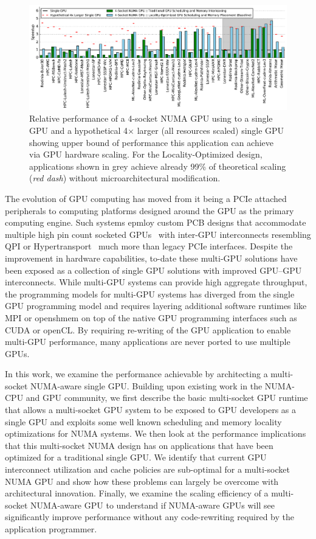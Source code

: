 \begin{figure}[tp] 
    \centering
    \includegraphics[width=1.0\linewidth]{figures/plot_different_baselines.pdf}
    \caption{Relative performance of a 4-socket NUMA GPU using to a single GPU 
and a hypothetical 4$\times$ larger (all resources scaled) single GPU showing 
upper bound of performance this application can achieve via GPU hardware 
scaling. For the Locality-Optimized design, applications shown in grey 
achieve already 99\% of theoretical scaling (\emph{red dash}) without 
microarchitectural modification.}
    \label{fig:motivation}
\end{figure}

The evolution of GPU computing has moved from it being a PCIe attached peripherals 
to computing platforms designed around the GPU as the primary computing engine. 
Such systems epmloy custom PCB designs that accommodate multiple high pin count socketed 
GPUs~\cite{DGX} with inter-GPU interconnects resembling QPI or 
Hypertransport~\cite{INTELQPI,AMDHT} much more than legacy PCIe interfaces.  
Despite the improvement in hardware capabilities, to-date these multi-GPU 
solutions have been exposed as a collection of single GPU solutions with improved GPU--GPU 
interconnects. While multi-GPU systems can provide high aggregate throughput, 
the programming models for multi-GPU systems has diverged from the single GPU 
programming model and requires layering additional software runtimes like MPI 
or openshmem on top of the native GPU programming interfaces such as CUDA or openCL.
By requiring re-writing of the GPU application to enable multi-GPU performance, 
many applications are never ported to use multiple GPUs.

In this work, we examine the performance achievable by architecting a 
multi-socket NUMA-aware single GPU.  Building upon existing work in the 
NUMA-CPU and GPU community, we first describe the basic multi-socket GPU runtime 
that allows a multi-socket GPU system to be exposed to GPU developers as a 
single GPU and exploits some well known scheduling and memory locality 
optimizations for NUMA systems. We then look at the performance implications 
that this multi-socket NUMA design has on applications that have been optimized 
for a traditional single GPU.  We identify that current GPU interconnect 
utilization and cache policies are sub-optimal for a multi-socket NUMA GPU and 
show how these problems can largely be overcome with architectural innovation.  
Finally, we examine the scaling efficiency of a multi-socket NUMA-aware GPU to 
understand if NUMA-aware GPUs will see significantly improve performance  
without any code-rewriting required by the application programmer.


